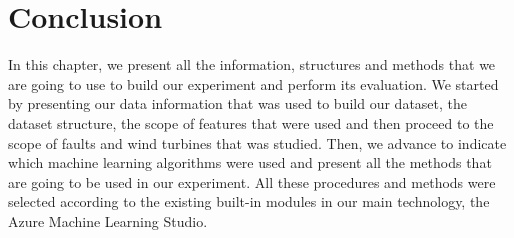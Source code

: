 
\section{Conclusion} 
\label{sub:if_you_use_this_template} 
In this chapter, we present all the information, structures and methods that we are going to use to build our experiment and perform its evaluation. We started by presenting our data information that was used to build our dataset, the dataset structure, the scope of features that were used and then proceed to the scope of faults and wind turbines that was studied. Then, we advance to indicate which machine learning algorithms were used and present all the methods that are going to be used in our experiment. All these procedures and methods were selected according to the existing built-in modules in our main technology, the Azure Machine Learning Studio.